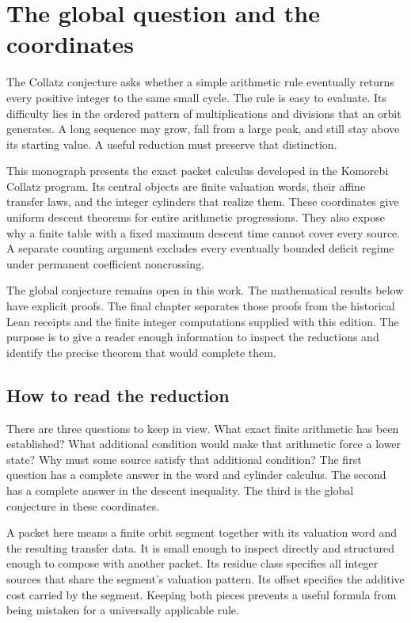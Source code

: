 \section{The global question and the coordinates}
The Collatz conjecture asks whether a simple arithmetic rule eventually returns every positive integer to the same small cycle. The rule is easy to evaluate. Its difficulty lies in the ordered pattern of multiplications and divisions that an orbit generates. A long sequence may grow, fall from a large peak, and still stay above its starting value. A useful reduction must preserve that distinction.

This monograph presents the exact packet calculus developed in the Komorebi Collatz program. Its central objects are finite valuation words, their affine transfer laws, and the integer cylinders that realize them. These coordinates give uniform descent theorems for entire arithmetic progressions. They also expose why a finite table with a fixed maximum descent time cannot cover every source. A separate counting argument excludes every eventually bounded deficit regime under permanent coefficient noncrossing.

The global conjecture remains open in this work. The mathematical results below have explicit proofs. The final chapter separates those proofs from the historical Lean receipts and the finite integer computations supplied with this edition. The purpose is to give a reader enough information to inspect the reductions and identify the precise theorem that would complete them.

\subsection{How to read the reduction}
There are three questions to keep in view. What exact finite arithmetic has been established? What additional condition would make that arithmetic force a lower state? Why must some source satisfy that additional condition? The first question has a complete answer in the word and cylinder calculus. The second has a complete answer in the descent inequality. The third is the global conjecture in these coordinates.

A packet here means a finite orbit segment together with its valuation word and the resulting transfer data. It is small enough to inspect directly and structured enough to compose with another packet. Its residue class specifies all integer sources that share the segment's valuation pattern. Its offset specifies the additive cost carried by the segment. Keeping both pieces prevents a useful formula from being mistaken for a universally applicable rule.


